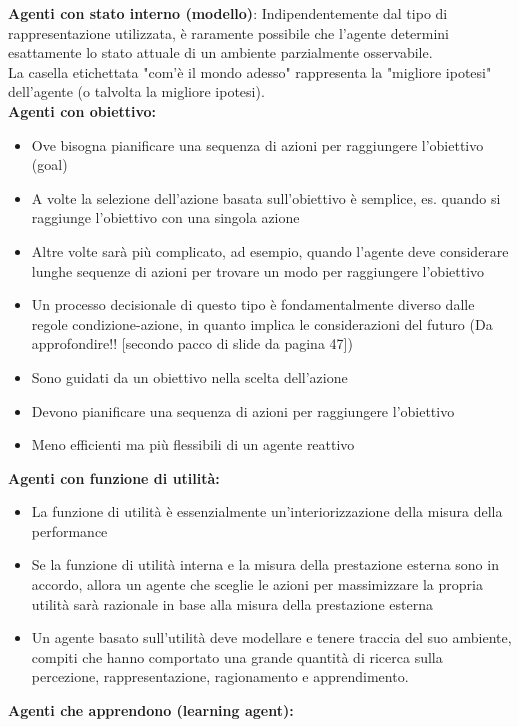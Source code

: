 \documentclass[../main.tex]{subfiles}
\begin{document}
	\textbf{Agenti con stato interno (modello)}: Indipendentemente dal tipo di rappresentazione utilizzata, è raramente possibile che l’agente determini esattamente lo stato attuale di un ambiente parzialmente osservabile.\\
	La casella etichettata "com’è il mondo adesso" rappresenta la "migliore ipotesi" dell'agente (o talvolta la migliore ipotesi).\\
	\textbf{Agenti con obiettivo:}
	\begin{itemize}
		\item Ove bisogna pianificare una sequenza di azioni per raggiungere l'obiettivo (goal)
		\item A volte la selezione dell'azione basata sull'obiettivo è semplice, es. quando si raggiunge l'obiettivo con una singola azione
		\item Altre volte sarà più complicato, ad esempio, quando l'agente deve considerare lunghe sequenze di azioni per trovare un modo per raggiungere l'obiettivo
		\item Un processo decisionale di questo tipo è fondamentalmente diverso dalle regole condizione-azione, in quanto implica le considerazioni del futuro {\color{red} (Da approfondire!! [secondo pacco di slide da pagina 47])}
		\item Sono guidati da un obiettivo nella scelta dell’azione
		\item Devono pianificare una sequenza di azioni per raggiungere l’obiettivo
		\item Meno efficienti ma più flessibili di un agente reattivo
	\end{itemize}
	\textbf{Agenti con funzione di utilità:}
	\begin{itemize}
		\item La funzione di utilità è essenzialmente un'interiorizzazione della misura della performance
		\item Se la funzione di utilità interna e la misura della prestazione esterna sono in accordo, allora un agente che sceglie le azioni per massimizzare la propria utilità sarà razionale in base alla misura della prestazione esterna
		\item Un agente basato sull'utilità deve modellare e tenere traccia del suo ambiente, compiti che hanno comportato una grande quantità di ricerca sulla percezione, rappresentazione, ragionamento e apprendimento.
	\end{itemize}
	\textbf{Agenti che apprendono (learning agent):}
\end{document}
